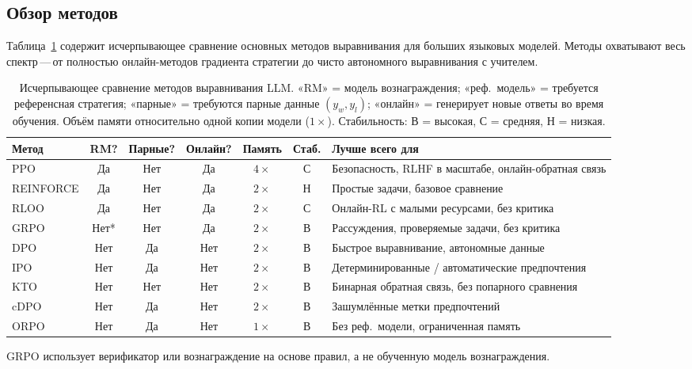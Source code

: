 \subsection{Обзор методов}

Таблица~\ref{tab:alignment-comparison} содержит исчерпывающее сравнение основных методов выравнивания для больших языковых моделей. Методы охватывают весь спектр\,---\,от полностью онлайн-методов градиента стратегии до чисто автономного выравнивания с учителем.

\begin{table}[ht]
\centering
\caption{Исчерпывающее сравнение методов выравнивания LLM. «RM» = модель вознаграждения; «реф.\ модель» = требуется референсная стратегия; «парные» = требуются парные данные $(y_w, y_l)$; «онлайн» = генерирует новые ответы во время обучения. Объём памяти относительно одной копии модели ($1\times$). Стабильность: В = высокая, С = средняя, Н = низкая.}
\label{tab:alignment-comparison}
\footnotesize
\begin{tabular}{@{}lcccccp{2.2cm}@{}}
\toprule
\textbf{Метод} & \textbf{RM?} & \textbf{Парные?} & \textbf{Онлайн?} & \textbf{Память} & \textbf{Стаб.} & \textbf{Лучше всего для} \\
\midrule
PPO        & Да  & Нет & Да  & $4\times$ & С & Безопасность, RLHF в масштабе, онлайн-обратная связь \\
REINFORCE  & Да  & Нет & Да  & $2\times$ & Н & Простые задачи, базовое сравнение \\
RLOO       & Да  & Нет & Да  & $2\times$ & С & Онлайн-RL с малыми ресурсами, без критика \\
GRPO       & Нет* & Нет & Да & $2\times$ & В & Рассуждения, проверяемые задачи, без критика \\
DPO        & Нет & Да  & Нет & $2\times$ & В & Быстрое выравнивание, автономные данные \\
IPO        & Нет & Да  & Нет & $2\times$ & В & Детерминированные / автоматические предпочтения \\
KTO        & Нет & Нет & Нет & $2\times$ & В & Бинарная обратная связь, без попарного сравнения \\
cDPO       & Нет & Да  & Нет & $2\times$ & В & Зашумлённые метки предпочтений \\
ORPO       & Нет & Да  & Нет & $1\times$ & В & Без реф.\ модели, ограниченная память \\
\bottomrule
\end{tabular}

\smallskip
{\footnotesize *GRPO использует верификатор или вознаграждение на основе правил, а не обученную модель вознаграждения.}
\end{table}

